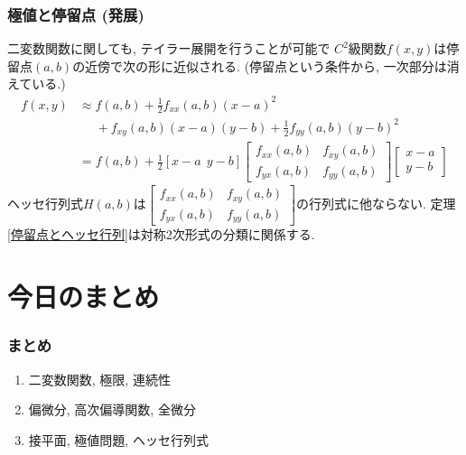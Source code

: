 \documentclass[dvipdfmx,cjk,10.2pt]{beamer}
\theoremstyle{definition}
\begin{document}


\begin{frame}
\frametitle{極値と停留点 (発展)}

二変数関数に関しても, テイラー展開を行うことが可能で
$C^2$級関数$f(x,y)$は停留点$(a,b)$の近傍で次の形に近似される. 
(停留点という条件から, 一次部分は消えている.)
\begin{align*}
f(x,y) & \approx f(a,b)+ \frac{1}{2}f_{xx}(a,b)(x-a)^2 \\
& \ \ \ \ \ \ +f_{xy}(a,b)(x-a)(y-b)+\frac{1}{2}f_{yy}(a,b)(y-b)^2 \\
& =  f(a,b)+ \frac{1}{2}[x-a \ \ y-b]
\begin{bmatrix} f_{xx}(a,b) & f_{xy}(a,b) \\ f_{yx}(a,b) & f_{yy}(a,b) \end{bmatrix}
\begin{bmatrix} x-a \\ y-b \end{bmatrix}
\end{align*}
ヘッセ行列式$H(a,b)$は$\begin{bmatrix} f_{xx}(a,b) & f_{xy}(a,b) \\ f_{yx}(a,b) & f_{yy}(a,b) \end{bmatrix}$の行列式に他ならない. 
定理\ref{停留点とヘッセ行列}は対称2次形式の分類に関係する. 

\end{frame}











\section{今日のまとめ}
\begin{frame}
\frametitle{まとめ}   


\begin{enumerate}
\item 二変数関数, 極限, 連続性
\item 偏微分, 高次偏導関数, 全微分
\item 接平面, 極値問題, ヘッセ行列式
\end{enumerate} 

\end{frame}
\end{document}
